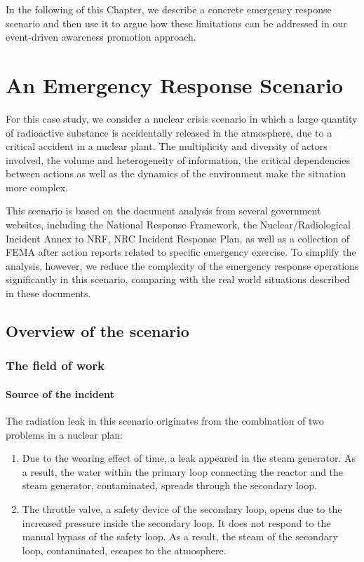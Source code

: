In the following of this Chapter, we describe a concrete emergency response scenario and then use it to argue how these limitations can be addressed in our event-driven awareness promotion approach.

\section{An Emergency Response Scenario} %
\label{sec:an_emergency_response_scenario}
For this case study, we consider a nuclear crisis scenario in which a large quantity of radioactive substance is accidentally released in the atmosphere, due to a critical accident in a nuclear plant. The multiplicity and diversity of actors involved, the volume and heterogeneity of information, the critical dependencies between actions as well as the dynamics of the environment make the situation more complex. 

This scenario is based on the document analysis from several government websites, including the National Response Framework, the Nuclear/Radiological Incident Annex to NRF, NRC Incident Response Plan, as well as a collection of FEMA after action reports related to specific emergency exercise. To simplify the analysis, however, we reduce the complexity of the emergency response operations significantly in this scenario, comparing with the real world situations described in these documents.

\subsection{Overview of the scenario} %
\label{sub:overview_of_the_scenario}
\subsubsection{The field of work} %
\label{ssub:overview_of_the_field_of_work}
\paragraph*{Source of the incident} %
\label{par:source_of_the_incident}
The radiation leak in this scenario originates from the combination of two problems in a nuclear plan:
\begin{enumerate}
	\item Due to the wearing effect of time, a leak appeared in the steam generator. As a result, the water within the primary loop connecting the reactor and the steam generator, contaminated, spreads through the secondary loop.
	\item The throttle valve, a safety device of the secondary loop, opens due to the increased pressure inside the secondary loop. It does not respond to the manual bypass of the safety loop. As a result, the steam of the secondary loop, contaminated, escapes to the atmosphere.
\end{enumerate}

